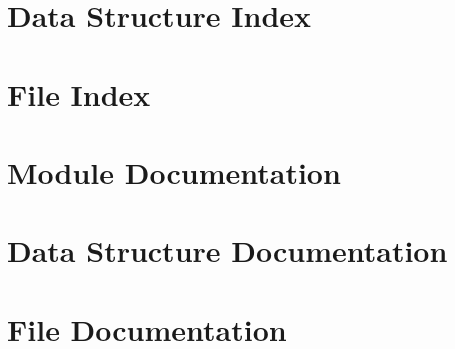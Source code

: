 \documentclass[twoside]{book}
\newcommand{\+}{\discretionary{\mbox{\scriptsize$\hookleftarrow$}}{}{}}
\newcommand{\clearemptydoublepage}{%
  \newpage{\pagestyle{empty}\cleardoublepage}%
}
\begin{document}
\chapter{Data Structure Index}

\chapter{File Index}

\chapter{Module Documentation}






















\chapter{Data Structure Documentation}


















\chapter{File Documentation}















\backmatter
\newpage
{}
\clearemptydoublepage
{}
\printindex
\end{document}
